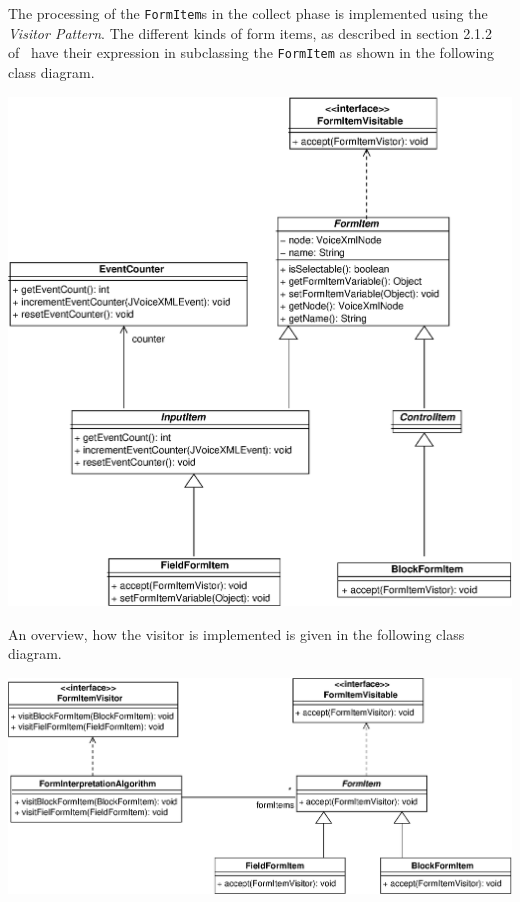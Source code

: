 \documentclass[11pt,a4paper]{article}
\begin{document}
The processing of the \texttt{FormItem}s in the collect phase
is implemented using the \emph{Visitor Pattern}.
The different kinds of form items, as described in section 2.1.2 
of~\cite{w3.org:voicexml} have their expression in subclassing the
\texttt{FormItem} as shown in the following class diagram.

\begin{center}
\includegraphics[scale=0.5]{class-interpreter-formitem.eps}
\end{center}

An overview, how the visitor is implemented is given in the following
class diagram.

\begin{center}
\includegraphics[scale=0.5]{class-interpreter-visitor.eps}
\end{center}
\end{document}
